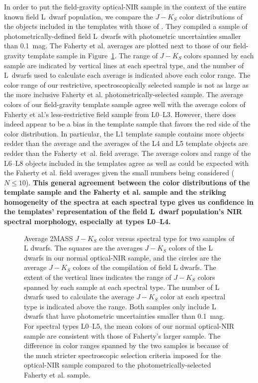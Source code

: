 \documentclass[12pt]{aastex6}
\begin{document}
In order to put the field-gravity optical-NIR sample in the context of the entire known field L~dwarf population, we compare the $J-K_S$ color distributions of the objects included in the templates with those of \citet{Faherty13_0355}.
They compiled a sample of photometrically-defined field L~dwarfs with photometric uncertainties smaller than 0.1~mag.
The Faherty et al. averages are plotted next to those of our field-gravity template sample in Figure~\ref{fig:JK_colors_F13}.
The range of $J-K_S$ colors spanned by each sample are indicated by vertical lines at each spectral type, and the number of L~dwarfs used to calculate each average is indicated above each color range.
The color range of our restrictive, spectroscopically selected sample is not as large as the more inclusive Faherty et al. photometrically-selected sample.
The average colors of our field-gravity template sample agree well with the average colors of Faherty et al.'s less-restrictive field sample from L0--L3.
However, there does indeed appear to be a bias in the template sample that favors the red side of the color distribution.
In particular, the L1 template sample contains more objects redder than the average and the averages of the L4 and L5 template objects are redder than the Faherty~et~al. field average.
The average colors and range of the L6--L8 objects included in the templates agree as well as could be expected with the Faherty et al. field averages given the small numbers being considered ($N\le10$).
\textbf{This general agreement between the color distributions of the template sample and the Faherty et al. sample and the striking homogeneity of the spectra at each spectral type gives us confidence in the templates' representation of the field L~dwarf population's NIR spectral morphology, especially at types L0--L4.}

\begin{figure}
    \caption{Average 2MASS $J-K_S$ color versus spectral type for two samples of L dwarfs. The squares are the averages $J-K_S$ colors of the L dwarfs in our normal optical-NIR sample, and the circles are the average $J-K_S$ colors of the \citet{Faherty13_0355} compilation of field L dwarfs. The extent of the vertical lines indicates the range of $J-K_S$ colors spanned by each sample at each spectral type. The number of L dwarfs used to calculate the average $J-K_S$ color at each spectral type is indicated above the range. Both samples only include L dwarfs that have photometric uncertainties smaller than 0.1~mag. For spectral types L0--L5, the mean colors of our normal optical-NIR sample are consistent with those of Faherty's larger sample. The difference in color ranges spanned by the two samples is because of the much stricter spectroscopic selection criteria imposed for the optical-NIR sample compared to the photometrically-selected Faherty et al. sample.}
  \label{fig:JK_colors_F13}
\end{figure}
\end{document}
